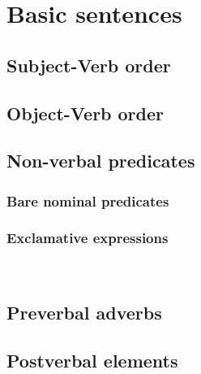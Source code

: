 \chapter{Basic sentences}

\section{Subject-Verb order}
\section{Object-Verb order}
\section{Non-verbal predicates}
\subsection{Bare nominal predicates}
\subsection{Exclamative expressions}\\
\section{Preverbal adverbs}
\section{Postverbal elements}
